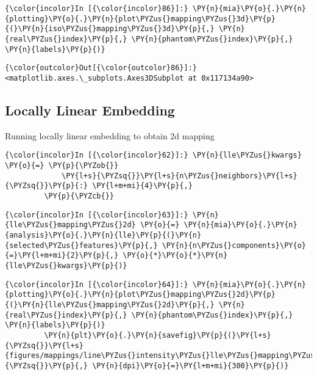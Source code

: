     \begin{Verbatim}[commandchars=\\\{\}]
{\color{incolor}In [{\color{incolor}86}]:} \PY{n}{mia}\PY{o}{.}\PY{n}{plotting}\PY{o}{.}\PY{n}{plot\PYZus{}mapping\PYZus{}3d}\PY{p}{(}\PY{n}{iso\PYZus{}mapping\PYZus{}3d}\PY{p}{,} \PY{n}{real\PYZus{}index}\PY{p}{,} \PY{n}{phantom\PYZus{}index}\PY{p}{,} \PY{n}{labels}\PY{p}{)}
\end{Verbatim}

            \begin{Verbatim}[commandchars=\\\{\}]
{\color{outcolor}Out[{\color{outcolor}86}]:} <matplotlib.axes.\_subplots.Axes3DSubplot at 0x117134a90>
\end{Verbatim}

    \subsection{Locally Linear Embedding}\label{locally-linear-embedding}

Running locally linear embedding to obtain 2d mapping

    \begin{Verbatim}[commandchars=\\\{\}]
{\color{incolor}In [{\color{incolor}62}]:} \PY{n}{lle\PYZus{}kwargs} \PY{o}{=} \PY{p}{\PYZob{}}
             \PY{l+s}{\PYZsq{}}\PY{l+s}{n\PYZus{}neighbors}\PY{l+s}{\PYZsq{}}\PY{p}{:} \PY{l+m+mi}{4}\PY{p}{,}
         \PY{p}{\PYZcb{}}
\end{Verbatim}

    \begin{Verbatim}[commandchars=\\\{\}]
{\color{incolor}In [{\color{incolor}63}]:} \PY{n}{lle\PYZus{}mapping\PYZus{}2d} \PY{o}{=} \PY{n}{mia}\PY{o}{.}\PY{n}{analysis}\PY{o}{.}\PY{n}{lle}\PY{p}{(}\PY{n}{selected\PYZus{}features}\PY{p}{,} \PY{n}{n\PYZus{}components}\PY{o}{=}\PY{l+m+mi}{2}\PY{p}{,} \PY{o}{*}\PY{o}{*}\PY{n}{lle\PYZus{}kwargs}\PY{p}{)}
\end{Verbatim}

    \begin{Verbatim}[commandchars=\\\{\}]
{\color{incolor}In [{\color{incolor}64}]:} \PY{n}{mia}\PY{o}{.}\PY{n}{plotting}\PY{o}{.}\PY{n}{plot\PYZus{}mapping\PYZus{}2d}\PY{p}{(}\PY{n}{lle\PYZus{}mapping\PYZus{}2d}\PY{p}{,} \PY{n}{real\PYZus{}index}\PY{p}{,} \PY{n}{phantom\PYZus{}index}\PY{p}{,} \PY{n}{labels}\PY{p}{)}
         \PY{n}{plt}\PY{o}{.}\PY{n}{savefig}\PY{p}{(}\PY{l+s}{\PYZsq{}}\PY{l+s}{figures/mappings/line\PYZus{}intensity\PYZus{}lle\PYZus{}mapping\PYZus{}2d.png}\PY{l+s}{\PYZsq{}}\PY{p}{,} \PY{n}{dpi}\PY{o}{=}\PY{l+m+mi}{300}\PY{p}{)}
\end{Verbatim}

